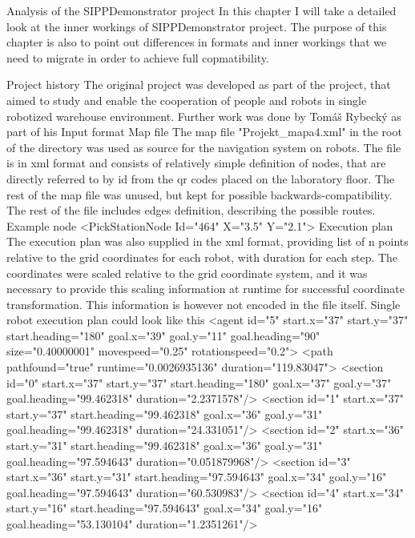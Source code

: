 \chap Analysis of the SIPPDemonstrator project
In this chapter I will take a detailed look at the inner workings of SIPPDemonstrator project. The purpose of this chapter is also to point out differences in formats and inner workings that we need to migrate in order to achieve full copmatibility.

\sec Project history
The original project was developed as part of the {\safeLog} project, that aimed to study and enable the cooperation of people and robots in single robotized warehouse environment. Further work was done by Tomáš Rybecký as part of his  \tomasMThesis
\sec Input format
\secc Map file
The map file "Projekt_mapa4.xml" in the root of the directory was used as source for the navigation system on robots. The file is in xml format and consists of relatively simple definition of nodes, that are directly referred to by id from the qr codes placed on the laboratory floor. The rest of the map file was unused, but kept for possible backwards-compatibility. The rest of the file includes edges definition, describing the possible routes.
\br
\br
Example node
\begtt
<PickStationNode Id="464" X="3.5" Y="2.1">
\endtt
\secc Execution plan
The execution plan was also supplied in the xml format, providing list of n points relative to the grid coordinates for each robot, with duration for each step. The coordinates were scaled relative to the grid coordinate system, and it was necessary to provide this scaling information at runtime for successful coordinate transformation. This information is however not encoded in the file itself.\br
Single robot execution plan could look like this
\begtt
<agent id="5" start.x="37" start.y="37" start.heading="180" goal.x="39" goal.y="11" goal.heading="90" size="0.40000001" movespeed="0.25" rotationspeed="0.2">
            <path pathfound="true" runtime="0.0026935136" duration="119.83047">
                <section id="0" start.x="37" start.y="37" start.heading="180" goal.x="37" goal.y="37" goal.heading="99.462318" duration="2.2371578"/>
                <section id="1" start.x="37" start.y="37" start.heading="99.462318" goal.x="36" goal.y="31" goal.heading="99.462318" duration="24.331051"/>
                <section id="2" start.x="36" start.y="31" start.heading="99.462318" goal.x="36" goal.y="31" goal.heading="97.594643" duration="0.051879968"/>
                <section id="3" start.x="36" start.y="31" start.heading="97.594643" goal.x="34" goal.y="16" goal.heading="97.594643" duration="60.530983"/>
                <section id="4" start.x="34" start.y="16" start.heading="97.594643" goal.x="34" goal.y="16" goal.heading="53.130104" duration="1.2351261"/>
